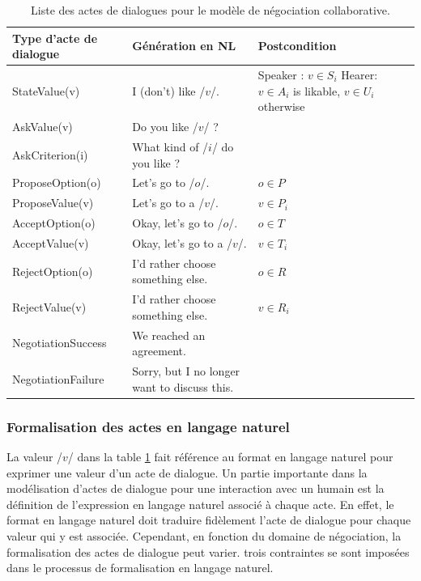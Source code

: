 				\begin{table}[t]
					\centering
					\begin{tabular} {|p{3.25cm}|p{6cm}|p{3.25cm}|}
						\hline
						\textbf{Type d'acte de dialogue}  &\textbf{ Génération en NL} & \textbf{Postcondition}\\
						\hline
						StateValue(v) &  I (don't) like /$v$/. & Speaker : $v \in S_i$ \newline Hearer:  \newline $v\in A_i$ is likable, $v\in U_i$ otherwise \\
						\hline
						AskValue(v)& Do you like /$v$/ ? & \multirow{2}{*}{} \\
						
						AskCriterion(i) &  What kind of /$i$/ do you like ? & \\
						\hline
						ProposeOption(o)  & Let's go to /$o$/. & $o \in P$\\
						
						ProposeValue(v) & Let's go to a /$v$/. & $v \in P_i$\\
						\hline
						AcceptOption(o)& Okay, let's go to /$o$/.& $o \in T$ \\
						
						AcceptValue(v) & Okay, let's go to a /$v$/.& $v \in T_i$ \\
						\hline
						RejectOption(o) & I'd rather choose  something else. & $o \in R$\\
						
						RejectValue(v) &  I'd rather choose  something else. & $v \in R_i$ \\
						\hline
						NegotiationSuccess &  We reached an agreement. & \multirow{2}{*}{}\\
						\cline{1-2}
						NegotiationFailure &  Sorry, but I no longer want to discuss this. & \\
						\hline
					\end{tabular}
					
					\caption{\label{table:utt}Liste des actes de dialogues pour le modèle de négociation collaborative.}
				\end{table}
				
		\subsubsection{Formalisation des actes en langage naturel}
		
			La valeur /$v$/ dans la table \ref{table:utt} fait référence au format en langage naturel pour exprimer une valeur d'un acte de dialogue.
			Un partie importante dans la modélisation d'actes de dialogue pour une interaction avec un humain est la définition de l'expression en langage naturel associé à chaque acte. En effet, le format en langage naturel doit traduire fidèlement l'acte de dialogue pour chaque valeur qui y est associée.
			Cependant, en fonction du domaine de négociation, la formalisation des actes de dialogue peut varier. trois contraintes se sont imposées dans le processus de formalisation en langage naturel. 
			

